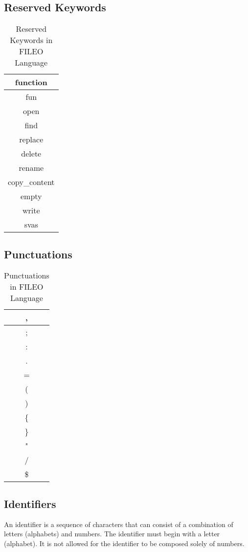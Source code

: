 \documentclass{article}
\begin{document}
\subsection{Reserved Keywords}
\begin{table}[h]
\centering
\caption{Reserved Keywords in FILEO Language}
\label{tab:ReservedKeywords}
\begin{tabular}{|c|}
\hline
function \\
\hline
fun \\
\hline
open \\
\hline
find \\
\hline
replace \\
\hline
delete\\
\hline
rename \\
\hline
copy\_content \\
\hline
empty \\
\hline
write \\
\hline
svas \\
\hline
\end{tabular}
\end{table}
\clearpage
\subsection{Punctuations}
\begin{table}[h]
\centering
\caption{Punctuations in FILEO Language}
\label{tab:Punctuations}
\begin{tabular}{|c|}
\hline
, \\
\hline
; \\
\hline
: \\
\hline
. \\
\hline
= \\
\hline
(\\
\hline
) \\
\hline
\{ \\
\hline
\} \\
\hline
" \\
\hline
/\\
\hline
\$\\
\hline
\end{tabular}
\end{table}
\subsection{Identifiers}
An identifier is a sequence of characters that can consist of a combination of letters (alphabets) and numbers. The identifier must begin with a letter (alphabet). It is not allowed for the identifier to be composed solely of numbers.
\end{document}
